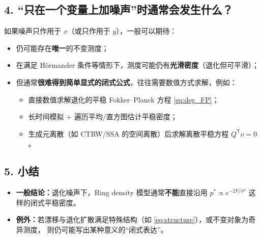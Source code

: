 	\subsection{4. ``只在一个变量上加噪声''时通常会发生什么？}
	
	如果噪声只作用于 $x$（或只作用于 $y$），一般可以期待：
	\begin{itemize}
		\item 仍可能存在\textbf{唯一}的不变测度；
		\item 在满足 Hörmander 条件等情形下，测度可能仍有\textbf{光滑密度}（退化但可平滑）；
		\item 但通常\textbf{很难得到简单显式的闭式公式}，往往需要数值方式求解，例如：
		\begin{itemize}
			\item 直接数值求解退化的平稳 Fokker--Planck 方程 \eqref{eq:deg_FP}；
			\item 长时间模拟 + 遍历平均/直方图估计平稳密度；
			\item 生成元离散（如 CTRW/SSA 的空间离散）后求解离散平稳方程 $Q^{\mathsf T}\nu=0$。
		\end{itemize}
	\end{itemize}
	
	\subsection{5. 小结}
	
	\begin{itemize}
		\item \textbf{一般结论：}退化噪声下，Ring density 模型通常\textbf{不能}直接沿用
		$p^*\propto e^{-2V/\sigma^2}$ 这样的闭式平稳密度。
		\item \textbf{例外：}若漂移与退化扩散满足特殊结构（如 \eqref{eq:structure}），或不变对象为奇异测度，
		则仍可能写出某种意义的“闭式表达”。
	\end{itemize}
	
